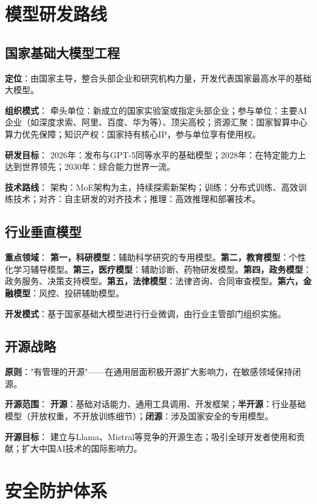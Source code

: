 \section{模型研发路线}

\subsection{国家基础大模型工程}

\textbf{定位}：由国家主导，整合头部企业和研究机构力量，开发代表国家最高水平的基础大模型。

\textbf{组织模式}：
牵头单位：新成立的国家实验室或指定头部企业；参与单位：主要AI企业（如深度求索、阿里、百度、华为等）、顶尖高校；资源汇聚：国家智算中心算力优先保障；知识产权：国家持有核心IP，参与单位享有使用权。

\textbf{研发目标}：
2026年：发布与GPT-5同等水平的基础模型；2028年：在特定能力上达到世界领先；2030年：综合能力世界一流。

\textbf{技术路线}：
架构：MoE架构为主，持续探索新架构；训练：分布式训练、高效训练技术；对齐：自主研发的对齐技术；推理：高效推理和部署技术。

\subsection{行业垂直模型}

\textbf{重点领域}：
\textbf{第一，科研模型}：辅助科学研究的专用模型。\textbf{第二，教育模型}：个性化学习辅导模型。\textbf{第三，医疗模型}：辅助诊断、药物研发模型。\textbf{第四，政务模型}：政务服务、决策支持模型。\textbf{第五，法律模型}：法律咨询、合同审查模型。\textbf{第六，金融模型}：风控、投研辅助模型。

\textbf{开发模式}：基于国家基础大模型进行行业微调，由行业主管部门组织实施。

\subsection{开源战略}

\textbf{原则}："有管理的开源"——在通用层面积极开源扩大影响力，在敏感领域保持闭源。

\textbf{开源范围}：
\textbf{开源}：基础对话能力、通用工具调用、开发框架；\textbf{半开源}：行业基础模型（开放权重，不开放训练细节）；\textbf{闭源}：涉及国家安全的专用模型。

\textbf{开源目标}：
建立与Llama、Mistral等竞争的开源生态；吸引全球开发者使用和贡献；扩大中国AI技术的国际影响力。

\section{安全防护体系}


